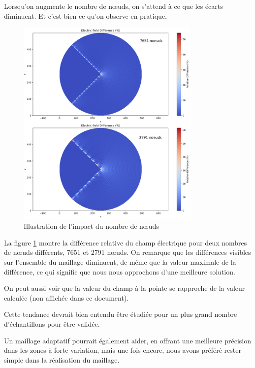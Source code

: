 \documentclass{article}
\begin{document}
Lorsqu'on augmente le nombre de nœuds, on s'attend à ce que les écarts
diminuent. Et c'est bien ce qu'on observe en pratique.

\begin{figure}[!h]
    \centering
    \includegraphics[width=0.8\textwidth]{img/difference_elec_7651.png}
    \caption{Illustration de l'impact du nombre de nœuds}
    \label{fig:nodes_number_impact}
\end{figure}

La figure \ref{fig:nodes_number_impact} montre la différence
relative du champ électrique pour deux nombres de nœuds
différents, 7651 et 2791 nœuds. On remarque que les
différences visibles sur l'ensemble du maillage diminuent,
de même que la valeur maximale de la différence, ce qui
signifie que nous nous approchons d'une meilleure solution.

On peut aussi voir que la valeur du champ à la pointe
se rapproche de la valeur calculée (non affichée dans ce document).

Cette tendance devrait bien entendu être étudiée pour un
plus grand nombre d'échantillons pour être validée.

Un maillage adaptatif pourrait également aider,
 en offrant une meilleure précision dans les
zones à forte variation, mais une fois encore,
nous avons préféré rester simple dans la réalisation
du maillage.

\newpage
\end{document}
